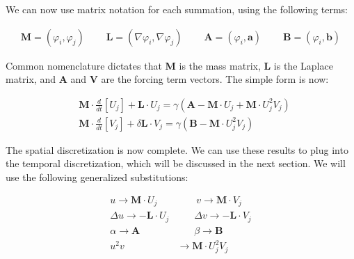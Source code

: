 \documentclass[12pt]{article}
\begin{document}
We can now use matrix notation for each summation, using the following terms:

\begin{equation*}
\begin{aligned}
\textbf{M} = (\varphi_i,\varphi_j) ~~~~~~~~~~ \textbf{L} = (\nabla\varphi_i, \nabla\varphi_j) ~~~~~~~~~~ \textbf{A} = (\varphi_i,\textbf{a}) ~~~~~~~~~~ \textbf{B} = (\varphi_i,\textbf{b})
\end{aligned}
\end{equation*}

Common nomenclature dictates that \textbf{M} is the mass matrix, \textbf{L} is the Laplace matrix, and \textbf{A} and \textbf{V} are the forcing term vectors. The simple form is now:

\begin{equation}
\begin{aligned}
&\textbf{M}\cdot\frac{d}{dt}[U_j] + \textbf{L}\cdot U_j = \gamma (\textbf{A} - \textbf{M}\cdot U_j + \textbf{M}\cdot U_j^2V_j) \\
&\textbf{M}\cdot\frac{d}{dt}[V_j] + \delta\textbf{L}\cdot V_j = \gamma (\textbf{B} - \textbf{M}\cdot U_j^2V_j)
\end{aligned}
\end{equation}

The spatial discretization is now complete. We can use these results to plug into the temporal discretization, which will be discussed in the next section. We will use the following generalized substitutions:

\begin{equation}\label{eq:space-d}
\begin{aligned}
u \rightarrow \textbf{M}\cdot U_j &~~~~~~~~\ v \rightarrow \textbf{M}\cdot V_j\\
\Delta u \rightarrow -\textbf{L}\cdot U_j &~~~~~~~~ \Delta v \rightarrow -\textbf{L}\cdot V_j\\
\alpha \rightarrow \textbf{A} &~~~~~~~~ \beta \rightarrow \textbf{B} \\	
u^2v &\rightarrow \textbf{M}\cdot U^2_jV_j\\
\end{aligned}
\end{equation}



\end{document}
